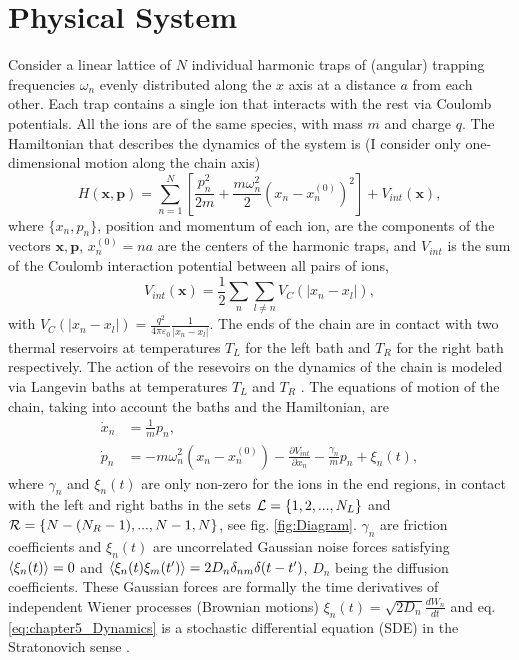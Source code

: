 \section{Physical System\label{sec:chapter5_PhysicalSystem}}
%
%
%
%
Consider a linear lattice of $N$ individual harmonic traps of (angular) trapping frequencies  $\omega_n$ evenly distributed along the $x$ axis at a distance $a$ from each other. Each trap contains a single ion that interacts with the rest via Coulomb potentials. All the ions are of the same species, with mass $m$ and charge $q$. The Hamiltonian that describes the dynamics of the system is (I consider only one-dimensional motion along the chain axis)
%
\begin{equation}
    H(\bm{x},\bm{p}) = \sum_{n=1}^N \left[\frac{p_n^2}{2m}  + \frac{m\omega_n^2}{2} (x_n - x_n^{(0)})^2\right] + V_{int}(\bm{x}),
    \label{eq:chapter5_ChainHamiltonian}
\end{equation}
%
where $\{x_n,p_n\}$, position and momentum of each ion, are the components of  the vectors
$\bm{x},\bm{p}$, $x_n^{(0)} = n  a$ are the centers of the harmonic traps, and $V_{int}$ is the sum of the Coulomb interaction potential between all  pairs of ions,
%
\begin{equation}
    V_{int}(\bm{x}) = \frac{1}{2}\sum_n \sum_{l\neq n} V_{C}(\left|x_n-x_l\right|),
    \label{eq:chapter5_InteractionHamiltonian}
\end{equation}
%
with $V_{C}(\left|x_n-x_l\right|) = \frac{q^2}{4\pi\varepsilon_0}\frac{1}{\left|x_n-x_l\right|}$. The ends of the chain are in contact with two thermal reservoirs at temperatures $T_L$ for the left bath and $T_R$ for the right bath respectively. The action of the resevoirs on the dynamics of the chain is modeled via Langevin baths at temperatures $T_L$ and $T_R$ \cite{Lepri2003,Dhar2018}. The equations of motion of the chain, taking into account the baths and the Hamiltonian, are
%
\begin{equation}
    \begin{split}
        \dot{x}_n &= \frac{1}{m}p_n, \\
        \dot{p}_n &= - m\omega_n^2 (x_n-x_n^{(0)}) - \frac{\partial V_{int}}{\partial x_n} - \frac{\gamma_n}{m}p_n + \xi_n(t),
    \end{split}
    \label{eq:chapter5_Dynamics}
\end{equation}
%
where $\gamma_n$ and $\xi_n(t)$ are only non-zero for the ions in the end regions, in contact with the left and right baths in the sets ${\cal L} = \left\{1,2,...,N_L\right\}$ and \linebreak ${\cal R} = \left\{N-(N_R-1),...,N-1,N\right\}$,  see fig. \ref{fig:Diagram}. $\gamma_n$ are friction coefficients and $\xi_n(t)$ are uncorrelated Gaussian noise forces satisfying $\expval{ \xi_n(t)} = 0$ and $\expval{ \xi_n(t)\xi_m(t') } = 2 D_n \delta_{nm}\delta(t-t')$, $D_n$ being the diffusion coefficients. These Gaussian forces are formally the time derivatives of independent Wiener processes (Brownian motions)   $\xi_n(t) = \sqrt{2D_n}\frac{dW_n}{dt}$ \cite{Toral2014,Ruiz2014} and eq. \eqref{eq:chapter5_Dynamics} is a stochastic differential equation (SDE) in the Stratonovich sense \cite{Toral2014}.

